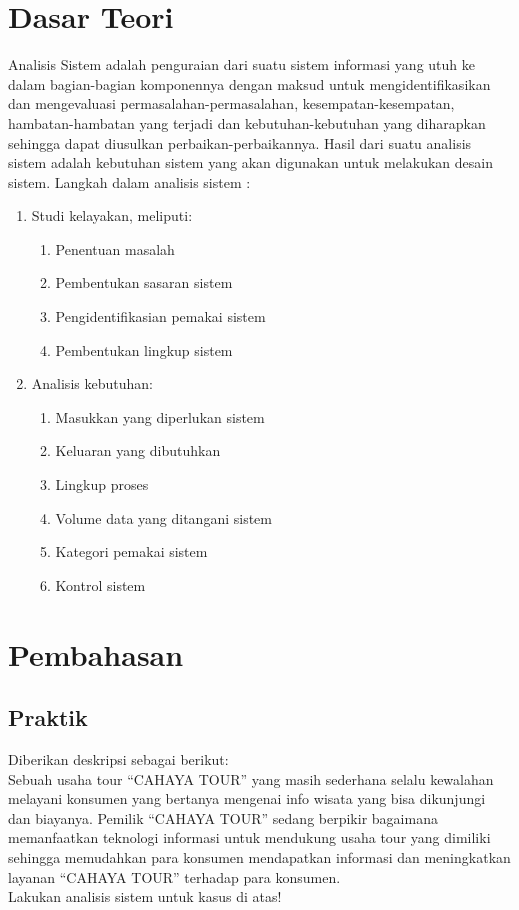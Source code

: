 \documentclass[a4paper,12pt]{article}
\begin{document}
\section{Dasar Teori}
Analisis Sistem adalah penguraian dari suatu sistem informasi yang utuh ke dalam bagian-bagian komponennya
dengan maksud untuk mengidentifikasikan dan mengevaluasi permasalahan-permasalahan, kesempatan-kesempatan,
hambatan-hambatan yang terjadi dan kebutuhan-kebutuhan yang diharapkan sehingga dapat diusulkan
perbaikan-perbaikannya. Hasil dari suatu analisis sistem adalah kebutuhan sistem yang akan digunakan untuk
melakukan desain sistem. Langkah dalam analisis sistem :
\begin{enumerate}
    \item Studi kelayakan, meliputi:
        \begin{enumerate}[label=\alph*.]
            \item Penentuan masalah
            \item Pembentukan sasaran sistem
            \item Pengidentifikasian pemakai sistem
            \item Pembentukan lingkup sistem
        \end{enumerate}
    \item Analisis kebutuhan:
        \begin{enumerate}[label=\alph*.] 
            \item Masukkan yang diperlukan sistem
            \item Keluaran yang dibutuhkan
            \item Lingkup proses
            \item Volume data yang ditangani sistem
            \item Kategori pemakai sistem
            \item Kontrol sistem
        \end{enumerate}
\end{enumerate}

\newpage

\section{Pembahasan}
\subsection{Praktik}
Diberikan deskripsi sebagai berikut:\\
Sebuah usaha tour “CAHAYA TOUR” yang masih sederhana selalu kewalahan melayani
konsumen yang bertanya mengenai info wisata yang bisa dikunjungi dan biayanya. Pemilik “CAHAYA TOUR” sedang  berpikir
bagaimana  memanfaatkan teknologi informasi untuk mendukung usaha tour yang dimiliki sehingga memudahkan para
konsumen mendapatkan informasi dan meningkatkan layanan “CAHAYA TOUR” terhadap para konsumen. \\
Lakukan analisis sistem untuk kasus di atas!
\end{document}
